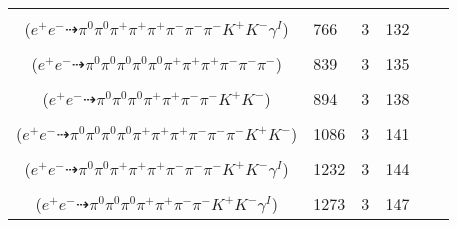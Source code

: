 \documentclass[landscape]{article}
\newcounter{rownumbers}
\newcommand\rn{\stepcounter{rownumbers}\arabic{rownumbers}}
\newcommand{\EOL}{\\} %
\newcommand{\topoTags}[1]{#1} %
\begin{document}
\begin{longtable}{clcccc}
\rn & \makecell[l]{ $ 
e^{+} e^{-} \rightarrow \pi^{0} \pi^{+} \pi^{-} \pi^{-} \omega \bar{K}^{*} K^{+} \gamma^{I} ,
\omega \rightarrow \pi^{0} \pi^{+} \pi^{-} ,
\bar{K}^{*} \rightarrow \pi^{+} K^{-} 
$ \\ ($
e^{+} e^{-} \dashrightarrow \pi^{0} \pi^{0} \pi^{+} \pi^{+} \pi^{+} \pi^{-} \pi^{-} \pi^{-} K^{+} K^{-} \gamma^{I} 
$) } & \topoTags{766 & }3 & 132 \EOL

\rn & \makecell[l]{ $ 
e^{+} e^{-} \rightarrow \pi^{0} \pi^{0} \pi^{0} \pi^{0} \rho^{0} \pi^{+} \pi^{-} \omega ,
\rho^{0} \rightarrow \pi^{+} \pi^{-} ,
\omega \rightarrow \pi^{0} \pi^{+} \pi^{-} 
$ \\ ($
e^{+} e^{-} \dashrightarrow \pi^{0} \pi^{0} \pi^{0} \pi^{0} \pi^{0} \pi^{+} \pi^{+} \pi^{+} \pi^{-} \pi^{-} \pi^{-} 
$) } & \topoTags{839 & }3 & 135 \EOL

\rn & \makecell[l]{ $ 
e^{+} e^{-} \rightarrow \pi^{0} \pi^{+} \pi^{-} \omega K^{+} K^{*-} ,
\omega \rightarrow \pi^{0} \pi^{+} \pi^{-} ,
K^{*-} \rightarrow \pi^{0} K^{-} 
$ \\ ($
e^{+} e^{-} \dashrightarrow \pi^{0} \pi^{0} \pi^{0} \pi^{+} \pi^{+} \pi^{-} \pi^{-} K^{+} K^{-} 
$) } & \topoTags{894 & }3 & 138 \EOL

\rn & \makecell[l]{ $ 
e^{+} e^{-} \rightarrow \pi^{0} \pi^{-} \pi^{-} \rho^{+} \rho^{+} \omega K^{+} K^{-} ,
\rho^{+} \rightarrow \pi^{0} \pi^{+} ,
\rho^{+} \rightarrow \pi^{0} \pi^{+} ,
\omega \rightarrow \pi^{0} \pi^{+} \pi^{-} 
$ \\ ($
e^{+} e^{-} \dashrightarrow \pi^{0} \pi^{0} \pi^{0} \pi^{0} \pi^{+} \pi^{+} \pi^{+} \pi^{-} \pi^{-} \pi^{-} K^{+} K^{-} 
$) } & \topoTags{1086 & }3 & 141 \EOL

\rn & \makecell[l]{ $ 
e^{+} e^{-} \rightarrow \pi^{0} \pi^{+} \pi^{+} \pi^{-} \pi^{-} \omega K^{+} K^{-} \gamma^{I} ,
\omega \rightarrow \pi^{0} \pi^{+} \pi^{-} 
$ \\ ($
e^{+} e^{-} \dashrightarrow \pi^{0} \pi^{0} \pi^{+} \pi^{+} \pi^{+} \pi^{-} \pi^{-} \pi^{-} K^{+} K^{-} \gamma^{I} 
$) } & \topoTags{1232 & }3 & 144 \EOL

\rn & \makecell[l]{ $ 
e^{+} e^{-} \rightarrow \pi^{0} \pi^{+} \pi^{-} \pi^{-} \rho^{+} K^{-} K^{*+} \gamma^{I} ,
\rho^{+} \rightarrow \pi^{0} \pi^{+} ,
K^{*+} \rightarrow \pi^{0} K^{+} 
$ \\ ($
e^{+} e^{-} \dashrightarrow \pi^{0} \pi^{0} \pi^{0} \pi^{+} \pi^{+} \pi^{-} \pi^{-} K^{+} K^{-} \gamma^{I} 
$) } & \topoTags{1273 & }3 & 147 \EOL


\end{longtable}
\end{document}
